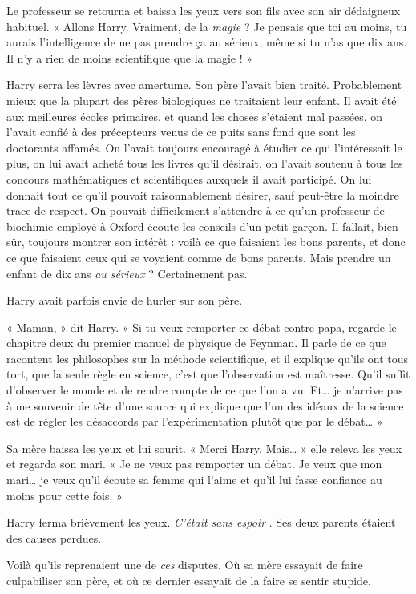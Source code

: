Le professeur se retourna et baissa les yeux vers son fils avec son air dédaigneux habituel. « Allons Harry. Vraiment, de la \emph{magie}  ? Je pensais que toi au moins, tu aurais l'intelligence de ne pas prendre ça au sérieux, même si tu n'as que dix ans. Il n'y a rien de moins scientifique que la magie ! »

Harry serra les lèvres avec amertume. Son père l'avait bien traité. Probablement mieux que la plupart des pères biologiques ne traitaient leur enfant. Il avait été aux meilleures écoles primaires, et quand les choses s'étaient mal passées, on l'avait confié à des précepteurs venus de ce puits sans fond que sont les doctorants affamés. On l'avait toujours encouragé à étudier ce qui l'intéressait le plus, on lui avait acheté tous les livres qu'il désirait, on l'avait soutenu à tous les concours mathématiques et scientifiques auxquels il avait participé. On lui donnait tout ce qu'il pouvait raisonnablement désirer, sauf peut-être la moindre trace de respect. On pouvait difficilement s'attendre à ce qu'un professeur de biochimie employé à Oxford écoute les conseils d'un petit garçon. Il fallait, bien sûr, toujours montrer son intérêt : voilà ce que faisaient les bons parents, et donc ce que faisaient ceux qui se voyaient comme de bons parents. Mais prendre un enfant de dix ans \emph{au sérieux}  ? Certainement pas.

Harry avait parfois envie de hurler sur son père.

« Maman, » dit Harry. « Si tu veux remporter ce débat contre papa, regarde le chapitre deux du premier manuel de physique de Feynman. Il parle de ce que racontent les philosophes sur la méthode scientifique, et il explique qu'ils ont tous tort, que la seule règle en science, c'est que l'observation est maîtresse. Qu'il suffit d'observer le monde et de rendre compte de ce que l'on a vu. Et… je n'arrive pas à me souvenir de tête d'une source qui explique que l'un des idéaux de la science est de régler les désaccords par l'expérimentation plutôt que par le débat… »

Sa mère baissa les yeux et lui sourit. « Merci Harry. Mais… » elle releva les yeux et regarda son mari. « Je ne veux pas remporter un débat. Je veux que mon mari… je veux qu'il écoute sa femme qui l'aime et qu'il lui fasse confiance au moins pour cette fois. »

Harry ferma brièvement les yeux. \emph{C'était sans espoir} . Ses deux parents étaient des causes perdues.

Voilà qu'ils reprenaient une de \emph{ces}  disputes. Où sa mère essayait de faire culpabiliser son père, et où ce dernier essayait de la faire se sentir stupide.

